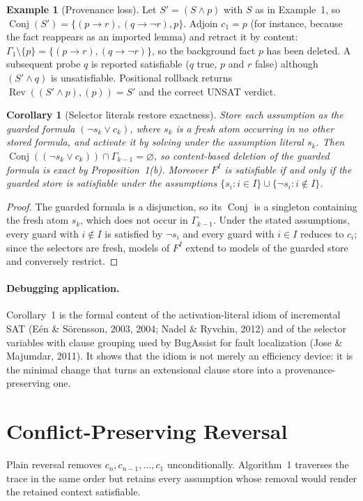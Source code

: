 \documentclass[11pt,reqno]{amsart}
\theoremstyle{plain}
\newtheorem{corollary}{Corollary}
\theoremstyle{definition}
\newtheorem{example}{Example}
\DeclareMathOperator{\Rev}{Rev}
\DeclareMathOperator{\Conj}{Conj}
\begin{document}
\begin{example}[Provenance loss]
Let $S'=(S\wedge p)$ with $S$ as in Example~1, so
$\Conj(S')=\{(p\rightarrow r),(q\rightarrow\neg r),p\}$. Adjoin $c_1=p$ (for
instance, because the fact reappears as an imported lemma) and retract it by
content: $\Gamma_1\setminus\{p\}=\{(p\rightarrow r),(q\rightarrow\neg r)\}$, so the
background fact $p$ has been deleted. A subsequent probe $q$ is reported
satisfiable ($q$ true, $p$ and $r$ false) although $(S'\wedge q)$ is unsatisfiable.
Positional rollback returns $\Rev((S'\wedge p),(p))=S'$ and the correct UNSAT
verdict.
\end{example}

\begin{corollary}[Selector literals restore exactness]
Store each assumption as the guarded formula $(\neg s_k\vee c_k)$, where $s_k$ is a
fresh atom occurring in no other stored formula, and activate it by solving under
the assumption literal $s_k$. Then
$\Conj((\neg s_k\vee c_k))\cap\Gamma_{k-1}=\varnothing$, so content-based deletion
of the guarded formula is exact by Proposition~1(b). Moreover $F^I$ is satisfiable
if and only if the guarded store is satisfiable under the assumptions
$\{s_i:i\in I\}\cup\{\neg s_i:i\notin I\}$.
\end{corollary}
\begin{proof}
The guarded formula is a disjunction, so its $\Conj$ is a singleton containing the
fresh atom $s_k$, which does not occur in $\Gamma_{k-1}$. Under the stated
assumptions, every guard with $i\notin I$ is satisfied by $\neg s_i$ and every
guard with $i\in I$ reduces to $c_i$; since the selectors are fresh, models of
$F^I$ extend to models of the guarded store and conversely restrict.
\end{proof}

\paragraph{Debugging application.} Corollary~1 is the formal content of the
activation-literal idiom of incremental SAT (E\'en \& S\"orensson, 2003, 2004;
Nadel \& Ryvchin, 2012) and of the selector variables with clause grouping used by
BugAssist for fault localization (Jose \& Majumdar, 2011). It shows that the idiom
is not merely an efficiency device: it is the minimal change that turns an
extensional clause store into a provenance-preserving one.

\section{Conflict-Preserving Reversal}
Plain reversal removes $c_n,c_{n-1},\dots,c_1$ unconditionally. Algorithm~1
traverses the trace in the same order but retains every assumption whose removal
would render the retained context satisfiable.
\end{document}

